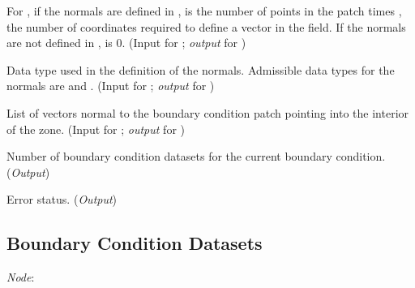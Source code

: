 \begin{Ventryi}{}
      For , if the normals are defined in
      ,  is the number of points
      in the patch times , the number of coordinates
      required to define a vector in the field.
      If the normals are not defined in ,
       is 0.
      (\textcolor{input}{Input} for ;
      \textcolor{output}{\textit{output}} for )
\item [\fort{NormalDataType}]
      Data type used in the definition of the normals.
      Admissible data types for the normals are  and
      .
      (\textcolor{input}{Input} for ;
      \textcolor{output}{\textit{output}} for )
\item [\fort{NormalList}]
      List of vectors normal to the boundary condition patch pointing
      into the interior of the zone.
      (\textcolor{input}{Input} for ;
      \textcolor{output}{\textit{output}} for )
\item [\fort{ndataset}]
      Number of boundary condition datasets for the current boundary
      condition.
      (\textcolor{output}{\textit{Output}})
\item [\fort{ier}]
      Error status.
      (\textcolor{output}{\textit{Output}})
\end{Ventryi}

\subsection{Boundary Condition Datasets}
\label{s:bcdataset}

\noindent
\textit{Node}: 


